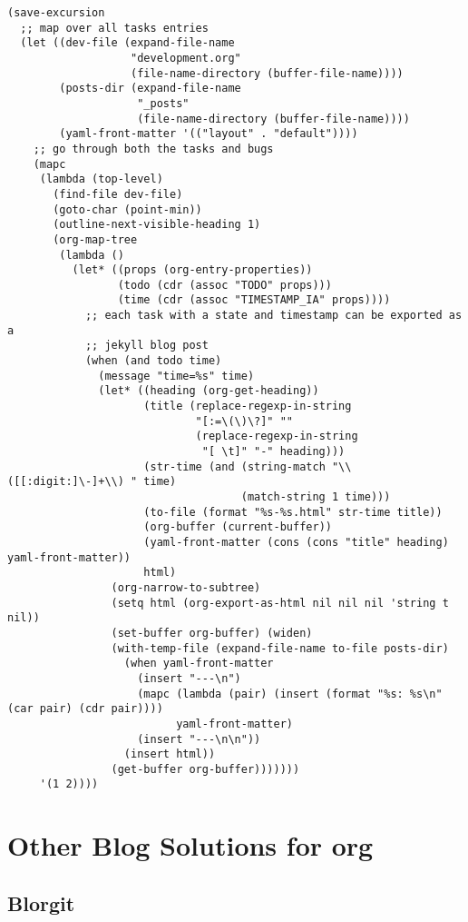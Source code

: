 \documentclass{article}
\begin{document}
\begin{verbatim}
(save-excursion
  ;; map over all tasks entries
  (let ((dev-file (expand-file-name
                   "development.org"
                   (file-name-directory (buffer-file-name))))
        (posts-dir (expand-file-name
                    "_posts"
                    (file-name-directory (buffer-file-name))))
        (yaml-front-matter '(("layout" . "default"))))
    ;; go through both the tasks and bugs
    (mapc
     (lambda (top-level)
       (find-file dev-file)
       (goto-char (point-min))
       (outline-next-visible-heading 1)
       (org-map-tree
        (lambda ()
          (let* ((props (org-entry-properties))
                 (todo (cdr (assoc "TODO" props)))
                 (time (cdr (assoc "TIMESTAMP_IA" props))))
            ;; each task with a state and timestamp can be exported as a
            ;; jekyll blog post
            (when (and todo time)
              (message "time=%s" time)
              (let* ((heading (org-get-heading))
                     (title (replace-regexp-in-string
                             "[:=\(\)\?]" ""
                             (replace-regexp-in-string
                              "[ \t]" "-" heading)))
                     (str-time (and (string-match "\\([[:digit:]\-]+\\) " time)
                                    (match-string 1 time)))
                     (to-file (format "%s-%s.html" str-time title))
                     (org-buffer (current-buffer))
                     (yaml-front-matter (cons (cons "title" heading) yaml-front-matter))
                     html)
                (org-narrow-to-subtree)
                (setq html (org-export-as-html nil nil nil 'string t nil))
                (set-buffer org-buffer) (widen)
                (with-temp-file (expand-file-name to-file posts-dir)
                  (when yaml-front-matter
                    (insert "---\n")
                    (mapc (lambda (pair) (insert (format "%s: %s\n" (car pair) (cdr pair))))
                          yaml-front-matter)
                    (insert "---\n\n"))
                  (insert html))
                (get-buffer org-buffer)))))))
     '(1 2))))
\end{verbatim}
\section{Other Blog Solutions for org}
\label{sec-12}
\subsection{Blorgit}
\label{sec-12-1}
\end{document}
